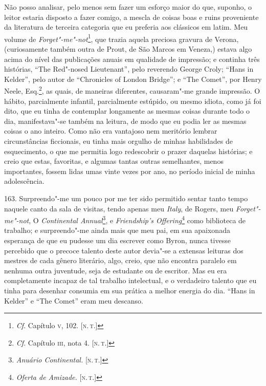 Não posso analisar, pelo menos sem fazer um esforço maior do que,
suponho, o leitor estaria disposto a fazer comigo, a mescla de coisas
boas e ruins proveniente da literatura de terceira categoria que eu
preferia aos clássicos em latim. Meu volume de
\emph{Forget"-me"-not}\footnote{\emph{Cf}. Capítulo \textsc{v}, 102. {[}\textsc{n.\,t.}{]}},
que trazia aquela preciosa gravura de Verona, (curiosamente também outra
de Prout, de São Marcos em Veneza,) estava algo acima do nível das
publicações anuais em qualidade de impressão; e continha três histórias,
``The Red"-nosed Lieutenant'', pelo reverendo George Croly; ``Hans in
Kelder'', pelo autor de ``Chronicles of London Bridge''; e ``The
Comet'', por Henry Neele, Esq.\footnote{\emph{Cf}. Capítulo \textsc{iii}, nota 4.
  {[}\textsc{n.\,t.}{]}}, as quais, de maneiras diferentes, causaram"-me grande
impressão. O hábito, parcialmente infantil, parcialmente estúpido, ou
mesmo idiota, como já foi dito, que eu tinha de contemplar longamente as
mesmas coisas durante todo o dia, manifestava"-se também na leitura, de
modo que eu podia ler as mesmas coisas o ano inteiro. Como não era
vantajoso nem meritório lembrar circunstâncias ficcionais, eu tinha mais
orgulho de minhas habilidades de esquecimento, o que me permitia logo
redescobrir o prazer daquelas histórias; e creio que estas, favoritas, e
algumas tantas outras semelhantes, menos importantes, fossem lidas umas
vinte vezes por ano, no período inicial de minha adolescência.

163. Surpreendo"-me um pouco por me ter sido permitido sentar tanto tempo
naquele canto da sala de visitas, tendo apenas meu \emph{Italy}, de
Rogers, meu \emph{Forget"-me"-not}, O \emph{Continental Annual}\footnote{\emph{Anuário
  Continental.} {[}\textsc{n.\,t.}{]}}, e \emph{Friendship's
Offering}\footnote{\emph{Oferta de Amizade.} {[}\textsc{n.\,t.}{]}} como
biblioteca de trabalho; e surpreendo"-me ainda mais que meu pai, em sua
apaixonada esperança de que eu pudesse um dia escrever como Byron, nunca
tivesse percebido que o precoce talento deste autor devia"-se a extensas
leituras dos mestres de cada gênero literário, algo, creio, que não
encontra paralelo em nenhuma outra juventude, seja de estudante ou de
escritor. Mas eu era completamente incapaz de tal trabalho intelectual,
e o verdadeiro talento que eu tinha para desenhar consumia em sua
prática a melhor energia do dia. ``Hans in Kelder'' e ``The Comet'' eram
meu descanso.

